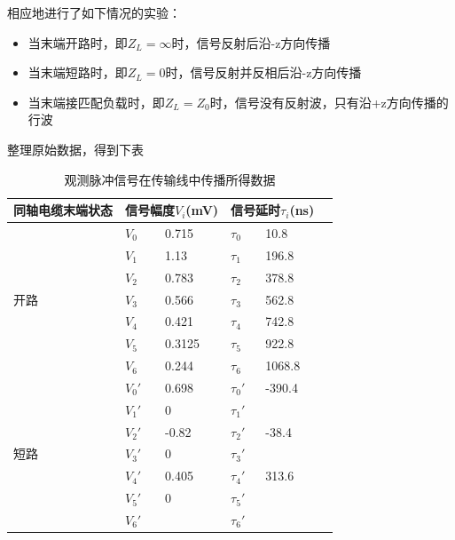 \documentclass[UTF8]{ctexart}
\begin{document}
相应地进行了如下情况的实验：
\begin{itemize}
\item 当末端开路时，即$Z_L=\infty $时，信号反射后沿-z方向传播
\item 当末端短路时，即$Z_L=0$时，信号反射并反相后沿-z方向传播
\item 当末端接匹配负载时，即$Z_L=Z_0$时，信号没有反射波，只有沿+z方向传播的行波
\end{itemize}

整理原始数据，得到下表
\begin{table}[H]
    \centering
\caption{观测脉冲信号在传输线中传播所得数据}
    \begin{tabular}{|l|l|l|l|l|l|}
    \hline
        同轴电缆末端状态 & \multicolumn{2}{|c|}{信号幅度$V_i$(mV)}   &\multicolumn{2}{|c|}{信号延时$\tau_i$(ns)}   \\ \hline
        \multirow{7}{*}{开路} & $V_0$ & 0.715 & $\tau_0$ & 10.8 \\ \cline{2-5}
         & $V_1$ & 1.13 & $\tau_1$ & 196.8 \\  \cline{2-5}
         & $V_2$ & 0.783 & $\tau_2$ & 378.8 \\  \cline{2-5}
         & $V_3$ & 0.566 & $\tau_3$ & 562.8 \\ \cline{2-5}
         & $V_4$ & 0.421 & $\tau_4$ & 742.8 \\  \cline{2-5}
         & $V_5$ & 0.3125 & $\tau_5$ & 922.8 \\  \cline{2-5}
         & $V_6$ & 0.244 & $\tau_6$ & 1068.8 \\ \hline
        \multirow{7}{*}{短路}  & $V_0'$ & 0.698 & $\tau_0'$ & -390.4 \\ \cline{2-5}
         & $V_1'$ & 0 & $\tau_1'$ &  \\ \cline{2-5}
         & $V_2'$ & -0.82 & $\tau_2'$ & -38.4 \\ \cline{2-5}
         & $V_3'$ & 0 & $\tau_3'$ &  \\\cline{2-5}
         & $V_4'$ & 0.405 & $\tau_4'$ & 313.6 \\\cline{2-5}
         & $V_5'$ & 0 & $\tau_5'$ &  \\ \cline{2-5}
         & $V_6'$ &  & $\tau_6'$ &  \\ \hline
    \end{tabular}
\end{table}
\end{document}
